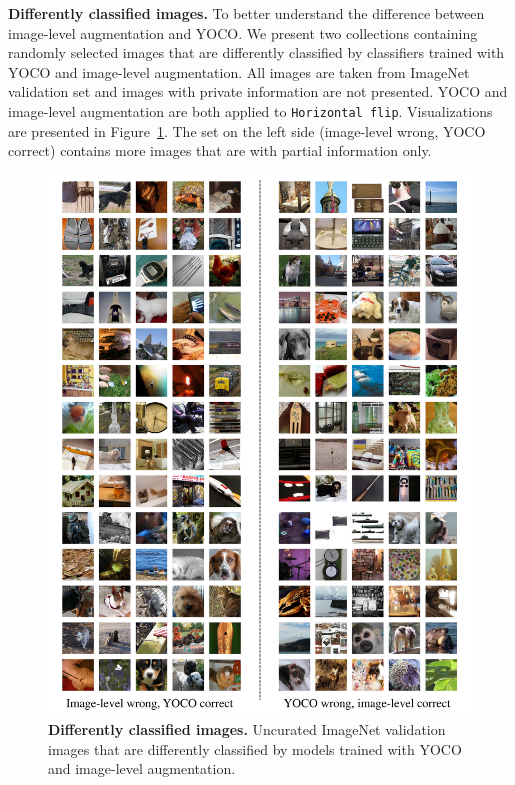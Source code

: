 \documentclass{article}
\begin{document}
\textbf{Differently classified images.} To better understand the difference between image-level augmentation and YOCO. We present two collections containing randomly selected images that are differently classified by classifiers trained with YOCO and image-level augmentation. All images are taken from ImageNet validation set and images with private information are not presented. YOCO and image-level augmentation are both applied to \texttt{Horizontal flip}. Visualizations are presented in Figure~\ref{fig:gallery}. The set on the left side (image-level wrong, YOCO correct) contains more images that are with partial information only. 

\begin{figure}[!htb]
     \centering
     \includegraphics[width = 17cm]
     {figures/gallery.pdf}
     \caption{\textbf{Differently classified images.} Uncurated ImageNet validation images that are differently classified by models trained with YOCO and image-level augmentation.}
     \label{fig:gallery}
\end{figure}
\end{document}
